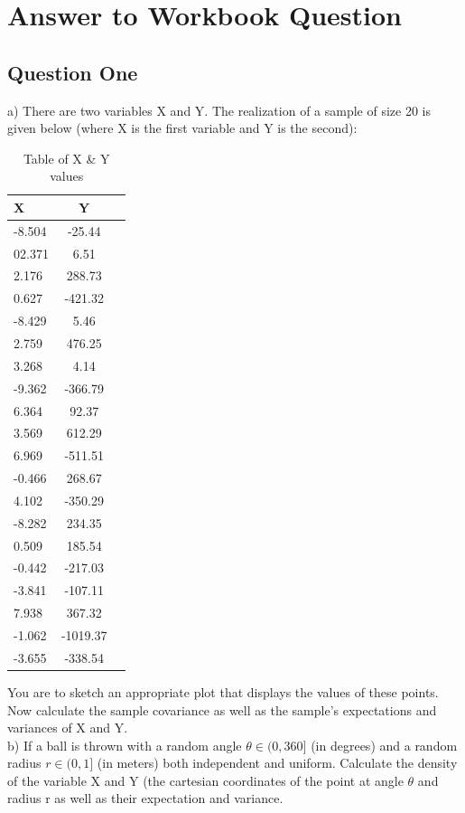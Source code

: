 \chapter{Answer to Workbook Question}

\section{Question One}

a) There are two variables X and Y. The realization of a sample of size 20 is given below (where X is the 
first variable and Y is the second):

\begin{table}[!h]
\small
\centering
\begin{tabular}{|l|c|r|}
\hline
X & Y \\
\hline
-8.504 & -25.44\\
02.371 & 6.51\\ 
2.176 & 288.73\\ 
0.627 & -421.32\\ 
-8.429 & 5.46\\ 
2.759 & 476.25\\ 
3.268 & 4.14\\ 
-9.362 & -366.79\\ 
6.364 & 92.37\\ 
3.569 & 612.29\\ 
6.969 & -511.51\\ 
-0.466 & 268.67\\ 
4.102 & -350.29\\ 
-8.282 & 234.35\\ 
0.509 & 185.54\\ 
-0.442 & -217.03\\ 
-3.841 & -107.11\\ 
7.938 & 367.32\\ 
-1.062 & -1019.37\\ 
-3.655 & -338.54\\
\hline
\end{tabular}
\caption{Table of X \& Y values}
\label{example:table}
\end{table}

You are to sketch an appropriate plot that displays the values of these  points. Now calculate the sample covariance as well as the sample's expectations and variances of X and Y.\\
b) If a ball is thrown with a random angle $\theta \in  (0, 360]$ (in degrees) and a random radius $r \in (0,1]$ (in meters) both independent and uniform. Calculate the density of the variable X and Y (the cartesian coordinates of the point at angle $\theta$ and radius r as well as their expectation and variance.

